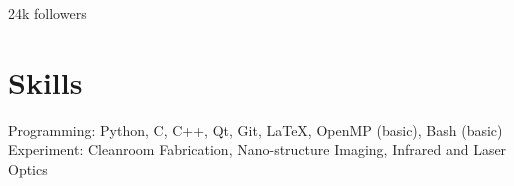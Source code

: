 \documentclass[11pt,letterpaper]{resume}
\begin{document}
24k followers

\section{Skills}
Programming: Python, C, C++, Qt, Git, \LaTeX, OpenMP (basic), Bash (basic)\\
Experiment: Cleanroom Fabrication, Nano-structure Imaging, 
Infrared and Laser Optics
\end{document}
